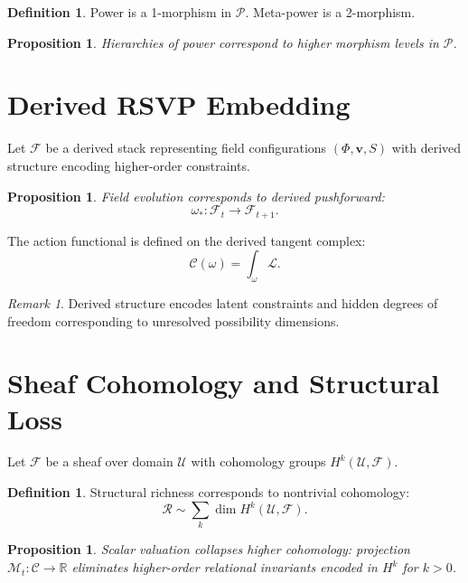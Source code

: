 \documentclass[11pt,a4paper]{article}
\newtheorem{proposition}[theorem]{Proposition}
\theoremstyle{definition}
\newtheorem{definition}[theorem]{Definition}
\theoremstyle{remark}
\newtheorem{remark}[theorem]{Remark}
\begin{document}
\begin{definition}
Power is a 1-morphism in $\mathcal{P}$. Meta-power is a 2-morphism.
\end{definition}

\begin{proposition}
Hierarchies of power correspond to higher morphism levels in $\mathcal{P}$.
\end{proposition}

\section{Derived RSVP Embedding}

Let $\mathcal{F}$ be a derived stack representing field configurations $(\Phi, \mathbf{v}, S)$ with derived structure encoding higher-order constraints.

\begin{proposition}
Field evolution corresponds to derived pushforward:
\[
\omega_* : \mathcal{F}_t \to \mathcal{F}_{t+1}.
\]
\end{proposition}

The action functional is defined on the derived tangent complex:
\[
\mathcal{C}(\omega) = \int_\omega \mathcal{L}.
\]

\begin{remark}
Derived structure encodes latent constraints and hidden degrees of freedom corresponding to unresolved possibility dimensions.
\end{remark}

\section{Sheaf Cohomology and Structural Loss}
\label{app:sheaf-cohomology}

Let $\mathcal{F}$ be a sheaf over domain $\mathcal{U}$ with cohomology groups $H^k(\mathcal{U}, \mathcal{F})$.

\begin{definition}
Structural richness corresponds to nontrivial cohomology:
\[
\mathcal{R} \sim \sum_k \dim H^k(\mathcal{U}, \mathcal{F}).
\]
\end{definition}

\begin{proposition}
Scalar valuation collapses higher cohomology: projection $\mathcal{M}_t : \mathcal{C} \to \mathbb{R}$ eliminates higher-order relational invariants encoded in $H^k$ for $k > 0$.
\end{proposition}
\end{document}

